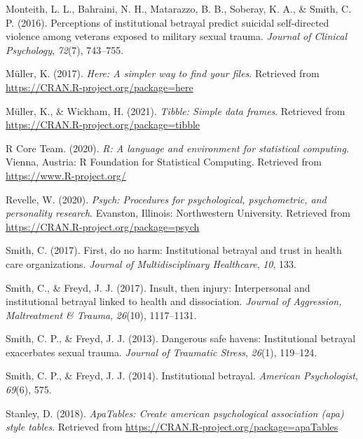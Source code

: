 \documentclass[
  english,
  man, noextraspace]{apa6}
\begin{document}
\leavevmode\hypertarget{ref-monteith2016}{}%
Monteith, L. L., Bahraini, N. H., Matarazzo, B. B., Soberay, K. A., \& Smith, C. P. (2016). Perceptions of institutional betrayal predict suicidal self-directed violence among veterans exposed to military sexual trauma. \emph{Journal of Clinical Psychology}, \emph{72}(7), 743--755.

\leavevmode\hypertarget{ref-R-here}{}%
Müller, K. (2017). \emph{Here: A simpler way to find your files}. Retrieved from \url{https://CRAN.R-project.org/package=here}

\leavevmode\hypertarget{ref-R-tibble}{}%
Müller, K., \& Wickham, H. (2021). \emph{Tibble: Simple data frames}. Retrieved from \url{https://CRAN.R-project.org/package=tibble}

\leavevmode\hypertarget{ref-R-base}{}%
R Core Team. (2020). \emph{R: A language and environment for statistical computing}. Vienna, Austria: R Foundation for Statistical Computing. Retrieved from \url{https://www.R-project.org/}

\leavevmode\hypertarget{ref-R-psych}{}%
Revelle, W. (2020). \emph{Psych: Procedures for psychological, psychometric, and personality research}. Evanston, Illinois: Northwestern University. Retrieved from \url{https://CRAN.R-project.org/package=psych}

\leavevmode\hypertarget{ref-smith2017first}{}%
Smith, C. (2017). First, do no harm: Institutional betrayal and trust in health care organizations. \emph{Journal of Multidisciplinary Healthcare}, \emph{10}, 133.

\leavevmode\hypertarget{ref-smith2017}{}%
Smith, C., \& Freyd, J. J. (2017). Insult, then injury: Interpersonal and institutional betrayal linked to health and dissociation. \emph{Journal of Aggression, Maltreatment \& Trauma}, \emph{26}(10), 1117--1131.

\leavevmode\hypertarget{ref-smith2013}{}%
Smith, C. P., \& Freyd, J. J. (2013). Dangerous safe havens: Institutional betrayal exacerbates sexual trauma. \emph{Journal of Traumatic Stress}, \emph{26}(1), 119--124.

\leavevmode\hypertarget{ref-smith2014}{}%
Smith, C. P., \& Freyd, J. J. (2014). Institutional betrayal. \emph{American Psychologist}, \emph{69}(6), 575.

\leavevmode\hypertarget{ref-R-apaTables}{}%
Stanley, D. (2018). \emph{ApaTables: Create american psychological association (apa) style tables}. Retrieved from \url{https://CRAN.R-project.org/package=apaTables}
\end{document}
